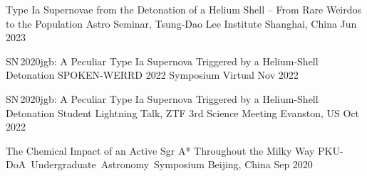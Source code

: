 


\begin{cventries}
	
	\cventry
	{Type Ia Supernovae from the Detonation of a Helium Shell -- From Rare Weirdos to the Population}
	{Astro Seminar, Tsung-Dao Lee Institute}
	{Shanghai, China}
	{Jun 2023}
	{}

	\cventry
	{SN\,2020jgb: A Peculiar Type Ia Supernova Triggered by a Helium-Shell Detonation} %
	{SPOKEN-WERRD 2022 Symposium} %
	{Virtual} %
	{Nov 2022} %
	{}

	\cventry
	{SN\,2020jgb: A Peculiar Type Ia Supernova Triggered by a Helium-Shell Detonation} %
	{Student Lightning Talk, ZTF 3rd Science Meeting} %
	{Evanston, US} %
	{Oct 2022} %
	{}
	
	\cventry
	{The Chemical Impact of an Active Sgr A* Throughout the Milky Way} %
	{PKU-DoA Undergraduate Astronomy Symposium} %
	{Beijing, China} %
	{Sep 2020} %
	{}


\end{cventries}